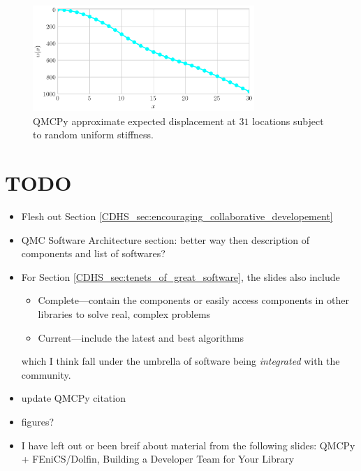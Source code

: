 \documentclass[graybox]{svmult}
\newcommand{\AGSComment}[1]{{\color{red} #1}}
\begin{document}
\begin{figure}
    \centering
    \includegraphics[height=4cm]{umbridge_muq.png}
    \caption{QMCPy approximate expected displacement at $31$ locations subject to random uniform stiffness. }
    \label{fig:umbridge_muq}
\end{figure}




\AGSComment{
\tableofcontents
\section*{TODO}
\begin{itemize}
    \item Flesh out Section \ref{CDHS_sec:encouraging_collaborative_developement}
    \item QMC Software Architecture section: better way then description of components and list of softwares?
    \item For Section \ref{CDHS_sec:tenets_of_great_software}, the slides also include
    \begin{itemize}
        \item  Complete---contain the components or  easily access components in other libraries to solve real, complex problems
        \item Current---include the latest and best algorithms
    \end{itemize}
    which I think fall under the umbrella of software being \emph{integrated} with the community.
    \item update QMCPy citation \cite{QMCPy2020a}
    \item figures?
    \item I have left out or been breif about material from the following slides: QMCPy + FEniCS/Dolfin,  Building a Developer Team for Your Library
\end{itemize}
}
\end{document}
